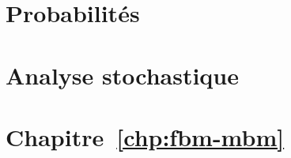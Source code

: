 \section{Probabilités}
\label{sec:appendix-probability}

\begin{proposition}
  \label{pro:cond-dist-gaussian}
\end{proposition}

\section{Analyse stochastique}
\label{sec:stochastic-analysis}

\begin{theoreme}
  \label{thm:kolmogorov-existence}
\end{theoreme}

\begin{theoreme}
  \label{thm:kolmogorov-continuity}
\end{theoreme}

\section{Chapitre~\ref{chp:fbm-mbm}}